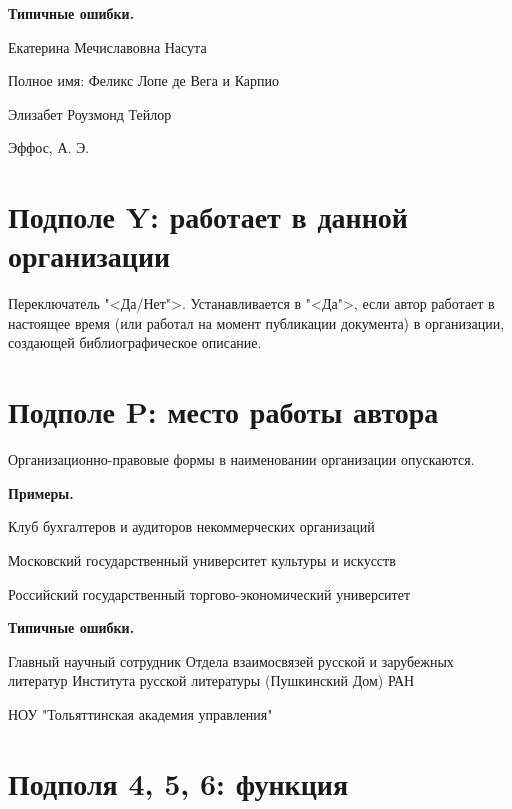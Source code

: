\textbf{Типичные ошибки.}

\begin{cutelist}
    \item Екатерина Мечиславовна Насута
    \item Полное имя: Феликс Лопе де Вега и Карпио
    \item Элизабет Роузмонд Тейлор
    \item Эффос, А. Э.
\end{cutelist}

\section{Подполе Y: работает в данной организации}

Переключатель "<Да/Нет">.
Устанавливается в "<Да">, если автор работает в настоящее время (или работал на момент публикации документа) в организации, создающей библиографическое описание.

\section{Подполе P: место работы автора}

Организационно-правовые формы в наименовании организации опускаются.

\textbf{Примеры.}

\begin{cutelist}
    \item Клуб бухгалтеров и аудиторов некоммерческих организаций
    \item Московский государственный университет культуры и искусств
    \item Российский государственный торгово-экономический университет
\end{cutelist}

\textbf{Типичные ошибки.}

\begin{cutelist}
    \item Главный научный сотрудник Отдела взаимосвязей русской и зарубежных литератур Института русской литературы (Пушкинский Дом) РАН
    \item НОУ "Тольяттинская академия управления"
\end{cutelist}

\section{Подполя 4, 5, 6: функция}


